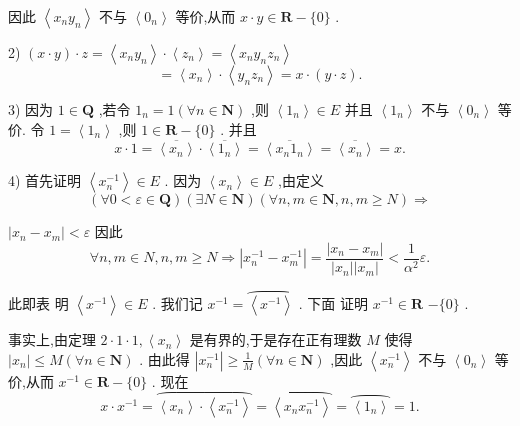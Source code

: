 因此 $\left\langle  {{x}_{n}{y}_{n}}\right\rangle$ 不与 $\left\langle  {0}_{n}\right\rangle$ 等价,从而 $x \cdot  y \in  \mathbf{R} - \{ 0\}$ .

2) $\left( {x \cdot  y}\right)  \cdot  z = \left\langle  {{x}_{n}{y}_{n}}\right\rangle   \cdot  \left\langle  {z}_{n}\right\rangle   = \left\langle  {{x}_{n}{y}_{n}{z}_{n}}\right\rangle$
$$= \left\langle  {x}_{n}\right\rangle   \cdot  \left\langle  {{y}_{n}{z}_{n}}\right\rangle   = x \cdot  \left( {y \cdot  z}\right) .$$

3) 因为 $1 \in  \mathbf{Q}$ ,若令 ${1}_{n} = 1\left( {\forall n \in  \mathbf{N}}\right)$ ,则 $\left\langle  {1}_{n}\right\rangle   \in  E$ 并且 $\left\langle  {1}_{n}\right\rangle$ 不与 $\left\langle  {0}_{n}\right\rangle$ 等价. 令 $1 = \left\langle  {1}_{n}\right\rangle$ ,则 $1 \in  \mathbf{R} - \{ 0\}$ . 并且
$$x \cdot  1 = \overline{\left\langle  {x}_{n}\right\rangle  } \cdot  \overline{\left\langle  {1}_{n}\right\rangle  } = \overline{\left\langle  {x}_{n}{1}_{n}\right\rangle  } = \overline{\left\langle  {x}_{n}\right\rangle  } = x.$$

4) 首先证明 $\left\langle  {x}_{n}^{-1}\right\rangle   \in  E$ . 因为 $\left\langle  {x}_{n}\right\rangle   \in  E$ ,由定义
$$\left( {\forall 0 < \varepsilon  \in  \mathbf{Q}}\right) \left( {\exists N \in  \mathbf{N}}\right) \left( {\forall n,m \in  \mathbf{N},n,m \geq  N}\right)  \Rightarrow$$

$\left| {{x}_{n} - {x}_{m}}\right|  < \varepsilon$ 因此
$$\forall n,m \in  N,n,m \geq  N \Rightarrow  \left| {{x}_{n}^{-1} - {x}_{m}^{-1}}\right|  = \frac{\left| {x}_{n} - {x}_{m}\right| }{\left| {x}_{n}\right| \left| {x}_{m}\right| } < \frac{1}{{\alpha }^{2}}\varepsilon .$$

此即表 明 $\left\langle  {x}^{-1}\right\rangle   \in  E$ . 我们记 ${x}^{-1} = \overset{⏜}{\left\langle  {x}^{-1}\right\rangle  }$ . 下面 证明 ${x}^{-1} \in  \mathbf{R}$  $- \{ 0\}$ .

事实上,由定理 $2 \cdot  1 \cdot  1,\left\langle  {x}_{n}\right\rangle$ 是有界的,于是存在正有理数 $M$ 使得 $\left| {x}_{n}\right|  \leq  M\left( {\forall n \in  \mathbf{N}}\right)$ . 由此得 $\left| {x}_{n}^{-1}\right|  \geq  \frac{1}{M}\left( {\forall n \in  \mathbf{N}}\right)$ ,因此 $\left\langle  {x}_{n}^{-1}\right\rangle$ 不与 $\left\langle  {0}_{n}\right\rangle$ 等价,从而 ${x}^{-1} \in  \mathbf{R} - \{ 0\}$ . 现在
$$x \cdot  {x}^{-1} = \overset{⏜}{\left\langle  {x}_{n}\right\rangle   \cdot  \left\langle  {x}_{n}^{-1}\right\rangle  } = \overset{⏜}{\left\langle  {x}_{n}{x}_{n}^{-1}\right\rangle  } = \overset{⏜}{\left\langle  {1}_{n}\right\rangle  } = 1.$$

